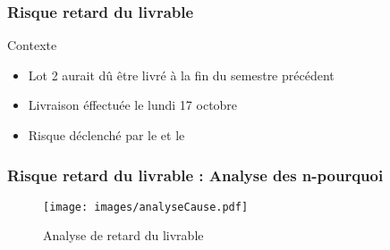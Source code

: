 \begin{frame}
\frametitle{Risque retard du livrable}
\begin{block}{Contexte}
\begin{itemize}
\item Lot 2 aurait dû être livré à la fin du semestre précédent
\item Livraison éffectuée le lundi 17 octobre
\item Risque déclenché par le \RQ{} et le \CP{}
\end{itemize}
\end{block}
\end{frame}

\begin{frame}
\frametitle{Risque retard du livrable : Analyse des n-pourquoi}
	\begin{figure}[!h]
		\begin{center}
			\texttt{[image: images/analyseCause.pdf]}
			\caption{Analyse de retard du livrable}
		\end{center}
	\end{figure}
\end{frame}

